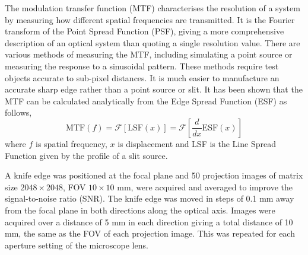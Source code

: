 The modulation transfer function (MTF) characterises the resolution of a system by measuring how different spatial frequencies are transmitted.
It is the Fourier transform of the Point Spread Function (PSF), giving a more comprehensive description of an optical system than quoting a single  resolution value. There are various methods of measuring the MTF, including simulating a point source or measuring the response to a sinusoidal pattern. These methods require test objects accurate to sub-pixel distances. 
It is much easier to manufacture an accurate  sharp edge rather than  a point source or slit. It has been shown that the MTF can be calculated analytically from the Edge Spread Function (ESF) as follows,
\begin{equation}
\mathrm{MTF}(f) = \mathscr{F}\left[\mathrm{LSF}(x)\right] = \mathscr{F}\left[\frac{d}{dx}\mathrm{ESF}(x)\right]
\label{eqn:MTF_ESF}
\end{equation}
where $f$ is spatial frequency, $x$ is displacement and LSF is the Line Spread Function given by the profile of a slit source. \cite{Boone:1986}


A knife edge was positioned at the focal plane and 50 projection images of matrix size $2048 \times 2048$, FOV $ 10 \times 10$ mm, were acquired and averaged to improve the signal-to-noise ratio (SNR). The knife edge was moved in steps of 0.1 mm away from the focal plane in both directions along the optical axis.  Images were acquired over a distance of 5 mm in each direction giving a total distance of 10 mm, the same as the FOV of each projection image. This was repeated for each aperture setting of the microscope lens.






